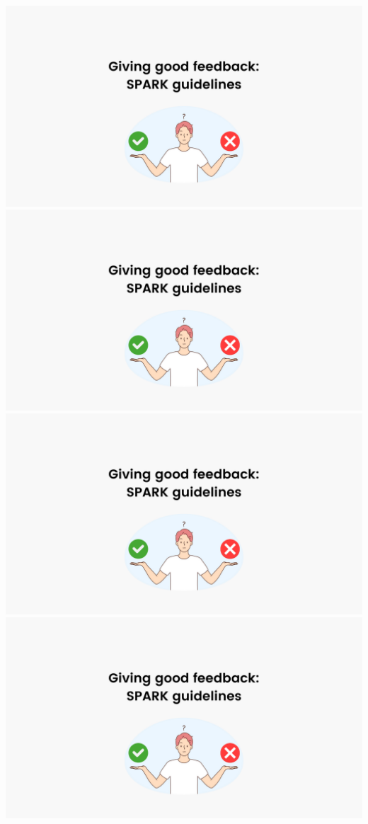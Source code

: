 	

\includegraphics[page=1,width=\textwidth]{resources/tutorial-05-WorkshopFeedbackSPARK.pdf}
\vfil
\includegraphics[page=2,width=\textwidth]{resources/tutorial-05-WorkshopFeedbackSPARK.pdf}
\vfil
\includegraphics[page=3,width=\textwidth]{resources/tutorial-05-WorkshopFeedbackSPARK.pdf}
\vfil
\includegraphics[page=4,width=\textwidth]{resources/tutorial-05-WorkshopFeedbackSPARK.pdf}
